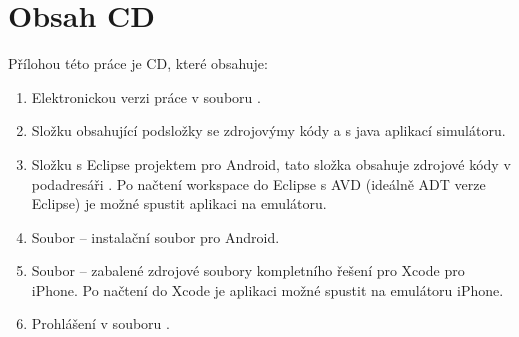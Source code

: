 \chapter{Obsah CD}
Přílohou této práce je CD, které obsahuje:
\begin{enumerate}
	\item Elektronickou verzi práce v souboru .
	\item Složku  obsahující podsložky  se zdrojovýmy kódy a  s java aplikací simulátoru.
	\item Složku  s Eclipse projektem pro Android, tato složka obsahuje zdrojové kódy v podadresáři . Po načtení workspace do Eclipse s AVD (ideálně ADT verze Eclipse) je možné spustit aplikaci na emulátoru.
	\item Soubor  -- instalační soubor pro Android.
	\item Soubor  -- zabalené zdrojové soubory kompletního řešení pro Xcode pro iPhone. Po načtení do Xcode je aplikaci možné spustit na emulátoru iPhone.
	\item Prohlášení v souboru .
\end{enumerate}